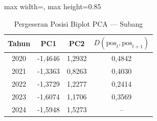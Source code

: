 \begin{table}[H]
\centering
\caption{Pergeseran Posisi Biplot PCA --- Subang} \label{tab:appjarak_pca_skor_subang}
\begin{adjustbox}{max width=\textwidth, max height=0.85\textheight}
\begin{tabular}{|c|c|c|c|}
\hline
\textbf{Tahun} & \textbf{PC1} & \textbf{PC2} & \textbf{$D(\text{pos}_t, \text{pos}_{t+1})$} \\
\hline
2020 & -1,4646 & 1,2932 & 0,4842 \\
2021 & -1,3363 & 0,8263 & 0,4030 \\
2022 & -1,3729 & 1,2277 & 0,2414 \\
2023 & -1,6074 & 1,1706 & 0,3569 \\
2024 & -1,5948 & 1,5273 & -- \\
\hline
\end{tabular}
\end{adjustbox}
\end{table}